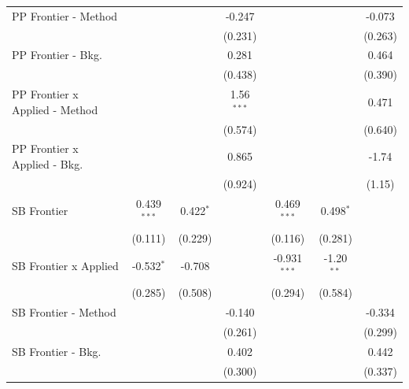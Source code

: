 \begin{tabular}{lcccccc}
   PP Frontier - Method           &                &             & -0.247        &                &              & -0.073\\   
                                  &                &             & (0.231)       &                &              & (0.263)\\   
   PP Frontier - Bkg.             &                &             & 0.281         &                &              & 0.464\\   
                                  &                &             & (0.438)       &                &              & (0.390)\\   
   PP Frontier x Applied - Method &                &             & 1.56$^{***}$  &                &              & 0.471\\   
                                  &                &             & (0.574)       &                &              & (0.640)\\   
   PP Frontier x Applied - Bkg.   &                &             & 0.865         &                &              & -1.74\\   
                                  &                &             & (0.924)       &                &              & (1.15)\\   
   SB Frontier                    & 0.439$^{***}$  & 0.422$^{*}$ &               & 0.469$^{***}$  & 0.498$^{*}$  &   \\   
                                  & (0.111)        & (0.229)     &               & (0.116)        & (0.281)      &   \\   
   SB Frontier x Applied          & -0.532$^{*}$   & -0.708      &               & -0.931$^{***}$ & -1.20$^{**}$ &   \\   
                                  & (0.285)        & (0.508)     &               & (0.294)        & (0.584)      &   \\   
   SB Frontier - Method           &                &             & -0.140        &                &              & -0.334\\   
                                  &                &             & (0.261)       &                &              & (0.299)\\   
   SB Frontier - Bkg.             &                &             & 0.402         &                &              & 0.442\\   
                                  &                &             & (0.300)       &                &              & (0.337)\\   

\end{tabular}
